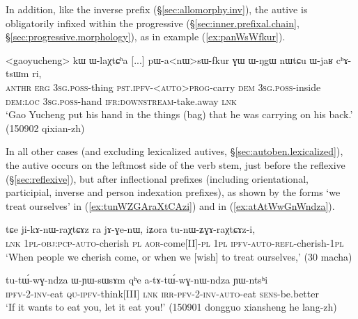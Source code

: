 In addition, like the inverse prefix (§\ref{sec:allomorphy.inv}), the autive is obligatorily infixed within the progressive  (§\ref{sec:inner.prefixal.chain}, §\ref{sec:progressive.morphology}), as in example (\ref{ex:panWsWfkur}). 

 \begin{exe}
\ex \label{ex:panWsWfkur}
\gll <gaoyucheng> kɯ ɯ-laχtɕʰa [...] pɯ-a<nɯ>sɯ-fkur ɣɯ ɯ-ŋgɯ nɯtɕu ɯ-jaʁ cʰɤ-tsɯm ri,\\
\textsc{anthr} \textsc{erg} \textsc{3sg}.\textsc{poss}-thing { } \textsc{pst}.\textsc{ipfv}-<\textsc{auto}>\textsc{prog}-carry \textsc{dem} \textsc{3sg}.\textsc{poss}-inside \textsc{dem}:\textsc{loc} \textsc{3sg}.\textsc{poss}-hand \textsc{ifr}:\textsc{downstream}-take.away \textsc{lnk}\\
\glt `Gao Yucheng put his hand in the things (bag) that he was carrying on his back.' (150902 qixian-zh)
\end{exe}

In all other cases (and excluding lexicalized autives, §\ref{sec:autoben.lexicalized}), the autive  occurs on the leftmost side of the verb stem, just before the reflexive (§\ref{sec:reflexive}), but after inflectional prefixes (including orientational, participial, inverse and person indexation prefixes), as shown by the forms  `we treat ourselves' in (\ref{ex:tunWZGAraXtCAzi}) and  in (\ref{ex:atAtWwGnWndza}).

\begin{exe}
\ex \label{ex:tunWZGAraXtCAzi}
\gll  tɕe ji-kɤ-nɯ-raχtɕɤz ra jɤ-ɣe-nɯ, iʑora tu-nɯ-ʑɣɤ-raχtɕɤz-i,  \\
\textsc{lnk} \textsc{1pl}-\textsc{obj}:\textsc{pcp}-\textsc{auto}-cherish \textsc{pl} \textsc{aor}-come[II]-\textsc{pl} \textsc{1pl} \textsc{ipfv}-\textsc{auto}-\textsc{refl}-cherish-\textsc{1pl} \\
\glt `When people we cherish come, or when we [wish] to treat ourselves,' (30 macha)
\end{exe}

\begin{exe}
\ex \label{ex:atAtWwGnWndza}
\gll tu-tɯ́-wɣ-ndza ɯ-ɲɯ-sɯsɤm qʰe a-tɤ-tɯ́-wɣ-nɯ-ndza ɲɯ-ntsʰi \\
\textsc{ipfv}-2-\textsc{inv}-eat \textsc{qu}-\textsc{ipfv}-think[III] \textsc{lnk} \textsc{irr}-\textsc{pfv}-2-\textsc{inv}-\textsc{auto}-eat \textsc{sens}-be.better \\
\glt  `If it wants to eat you, let it eat you!'  (150901 dongguo xiansheng he lang-zh)
\end{exe}

